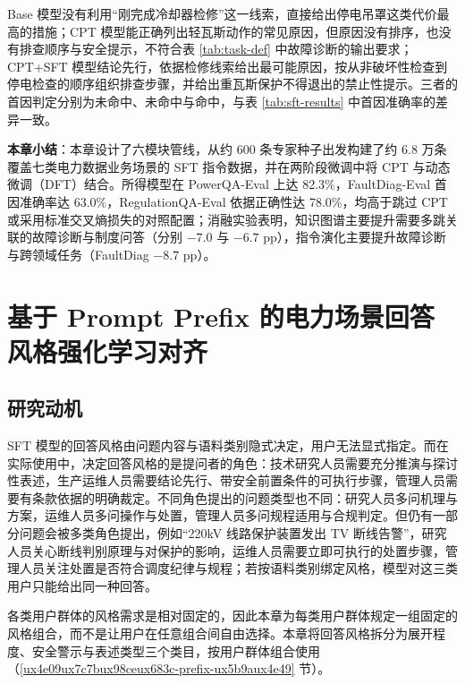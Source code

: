 \documentclass[fontset=fandol,type=master,campus=shenzhen,etitleauto=true]{hithesisbook}
\begin{document}
Base 模型没有利用“刚完成冷却器检修”这一线索，直接给出停电吊罩这类代价最高的措施；CPT 模型能正确列出轻瓦斯动作的常见原因，但原因没有排序，也没有排查顺序与安全提示，不符合表 \ref{tab:task-def} 中故障诊断的输出要求；CPT+SFT 模型结论先行，依据检修线索给出最可能原因，按从非破坏性检查到停电检查的顺序组织排查步骤，并给出重瓦斯保护不得退出的禁止性提示。三者的首因判定分别为未命中、未命中与命中，与表 \ref{tab:sft-results} 中首因准确率的差异一致。

\vspace{0.5cm}
\noindent \textbf{本章小结}：本章设计了六模块管线，从约 600 条专家种子出发构建了约 6.8 万条覆盖七类电力数据业务场景的 SFT 指令数据，并在两阶段微调中将 CPT 与动态微调（DFT）结合。所得模型在 PowerQA-Eval 上达 82.3\%，FaultDiag-Eval 首因准确率达 63.0\%，RegulationQA-Eval 依据正确性达 78.0\%，均高于跳过 CPT 或采用标准交叉熵损失的对照配置；消融实验表明，知识图谱主要提升需要多跳关联的故障诊断与制度问答（分别 $-7.0$ 与 $-6.7$ pp），指令演化主要提升故障诊断与跨领域任务（FaultDiag $-8.7$ pp）。

\chapter{基于 Prompt Prefix 的电力场景回答风格强化学习对齐}\label{ux57faux4e8e-prompt-prefix-ux7684ux7535ux529bux573aux666fux56deux7b54ux98ceux683cux5f3aux5316ux5b66ux4e60ux5bf9ux9f50}

\section{研究动机}\label{ux7814ux7a76ux52a8ux673a-1}

SFT 模型的回答风格由问题内容与语料类别隐式决定，用户无法显式指定。而在实际使用中，决定回答风格的是提问者的角色：技术研究人员需要充分推演与探讨性表述，生产运维人员需要结论先行、带安全前置条件的可执行步骤，管理人员需要有条款依据的明确裁定。不同角色提出的问题类型也不同：研究人员多问机理与方案，运维人员多问操作与处置，管理人员多问规程适用与合规判定。但仍有一部分问题会被多类角色提出，例如“220kV 线路保护装置发出 TV 断线告警”，研究人员关心断线判别原理与对保护的影响，运维人员需要立即可执行的处置步骤，管理人员关注处置是否符合调度纪律与规程；若按语料类别绑定风格，模型对这三类用户只能给出同一种回答。

各类用户群体的风格需求是相对固定的，因此本章为每类用户群体规定一组固定的风格组合，而不是让用户在任意组合间自由选择。本章将回答风格拆分为展开程度、安全警示与表述类型三个类目，按用户群体组合使用（\ref{ux4e09ux7c7bux98ceux683c-prefix-ux5b9aux4e49} 节）。
\end{document}
